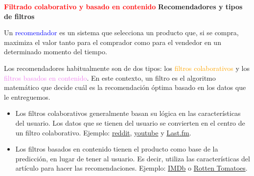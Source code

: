 \documentclass[11pt]{beamer}
\begin{document}
\begin{frame}{\textbf{\textcolor{red}{Filtrado colaborativo y basado en contenido}}}
\textbf{Recomendadores y tipos de filtros}

\vspace{0.2cm}

\scriptsize{Un \textcolor{blue}{recomendador} es un sistema que selecciona un producto que, si se compra, maximiza el valor tanto para el comprador como para el vendedor en un determinado momento del tiempo. 
	
Los recomendadores habitualmente son de dos tipos: los \textcolor{orange}{filtros colaborativos} y los \textcolor{violet}{filtros  basados en contenido}. En este contexto, un filtro es el algoritmo matem\'atico que decide cu\'al es la recomendaci\'on \'optima basado en los datos que le entreguemos.

\begin{itemize}
	\item Los filtros colaborativos generalmente basan su l\'ogica en las caracter\'isticas del usuario. Los datos que se tienen del usuario se convierten en el centro de un filtro colaborativo. Ejemplo: \href{https://www.reddit.com/}{reddit}, \href{https://www.youtube.com}{youtube}  y \href{https://www.last.fm/}{Last.fm}.
	
	\item Los filtros basados en contenido tienen el producto como base de la predicci\'on, en lugar de tener al usuario. Es decir, utiliza las caracter\'isticas del art\'iculo para hacer las recomendaciones. Ejemplo: \href{http://www.imdb.com/}{IMDb} o \href{https://www.rottentomatoes.com/}{Rotten Tomatoes}.
\end{itemize}  }
\end{frame}
\end{document}
